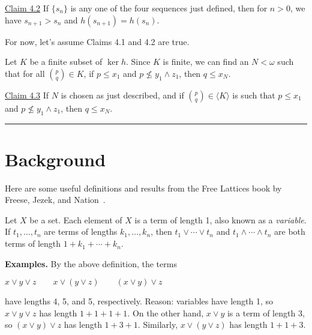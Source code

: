 {\bigskip

\noindent \underline{Claim 4.2} If $\{s_n\}$ is any one of the four sequences just defined, then for $n>0$, we have $s_{n+1} > s_n$ and $h(s_{n+1}) = h(s_n)$.

\medskip


\bigskip

\noindent For now, let's assume Claims 4.1 and 4.2 are true.

\medskip

\noindent Let $K$ be a finite subset of $\ker h$.  Since $K$ is finite, we can find an $N < \omega$ such that for all $\binom{p}{q} \in K$, if $p \leqslant x_1$ and $p \nleqslant y_1 \wedge z_1$, then $q \leqslant x_N$.

\medskip

\noindent \underline{Claim 4.3} If $N$ is chosen as just described, and if $\binom{p}{q} \in \langle K \rangle$ is such that $p \leqslant x_1$ and $p\nleqslant y_1 \wedge z_1$, then $q \leq x_N$.

\medskip



\bigskip


\bigskip
\hrule
\bigskip

  \appendix

\section{Background}
Here are some useful definitions and results from the Free Lattices book by Freese, Jezek, and Nation~\cite{MR1319815}.

\begin{definition} Let $X$ be a set. Each element of $X$ is a term of length 1, also known as a \emph{variable}. If $t_1, \dots, t_n$ are terms of 
lengths $k_1, \dots, k_n$, then $t_1 \vee \cdots \vee t_n$ and 
$t_1 \wedge \cdots \wedge t_n$ are both terms of length $1+ k_1 + \cdots + k_n$.
\end{definition}

{\bf Examples.} By the above definition, the terms 

$x \vee y \vee z \qquad x \vee (y \vee z) \qquad (x \vee y) \vee z$

have lengths 4, 5, and 5, respectively. Reason: variables have length 1, so $x \vee y \vee z$ has length $1 + 1 + 1 + 1$.  On the other hand, $x\vee y$ is a term of length $3$, so $(x \vee y) \vee z$ has length $1 + 3 + 1$. Similarly, 
$x \vee (y \vee z)$ has length $1 + 1 + 3$.

}
